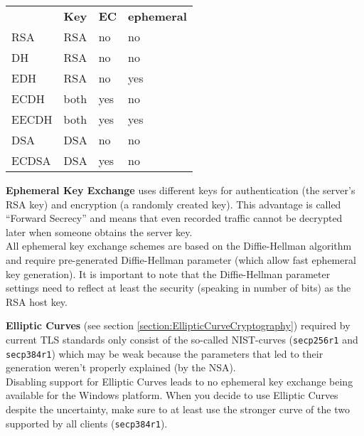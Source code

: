 \begin{center}
\begin{tabular}{llll}
    \toprule
          & \textbf{Key}  & \textbf{EC}  & \textbf{ephemeral} \\ \cmidrule(lr){1-4}
   RSA    & RSA           & no           & no                 \\
   DH     & RSA           & no           & no                 \\
   EDH    & RSA           & no           & yes                \\
   ECDH   & both          & yes          & no                 \\
   EECDH  & both          & yes          & yes                \\
   DSA    & DSA           & no           & no                 \\
   ECDSA  & DSA           & yes          & no                 \\
\bottomrule
\end{tabular}
\end{center}

\textbf{Ephemeral Key Exchange} uses different keys for authentication (the server's RSA
key) and encryption (a randomly created key). This advantage is called ``Forward
Secrecy'' and means that even recorded traffic cannot be decrypted later when someone
obtains the server key. \\
All ephemeral key exchange schemes are based on the Diffie-Hellman algorithm and require
pre-generated Diffie-Hellman parameter (which allow fast ephemeral key generation). It
is important to note that the Diffie-Hellman parameter settings need to reflect at least 
the security (speaking in number of bits) as the RSA host key. 


\textbf{Elliptic Curves} (see section \ref{section:EllipticCurveCryptography})
required by current TLS standards only consist of the so-called NIST-curves
(\texttt{secp256r1} and \texttt{secp384r1}) which may be weak because the
parameters that led to their generation weren't properly explained (by the
NSA)\cite{DJBSC}. \\ Disabling support for Elliptic Curves leads to no
ephemeral key exchange being available for the Windows platform. When you
decide to use Elliptic Curves despite the uncertainty, make sure to at least
use the stronger curve of the two supported by all clients
(\texttt{secp384r1}).


